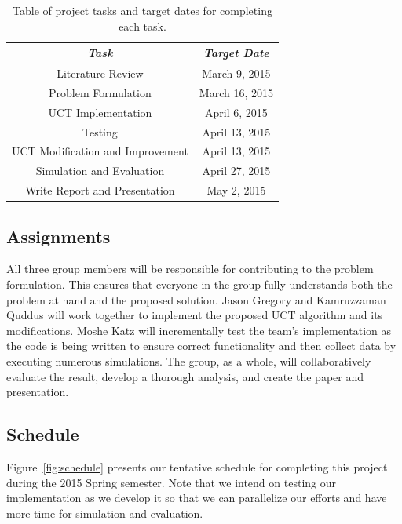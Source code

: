 \documentclass[a4paper,11pt]{article}
\begin{document}
%
\begin{table}[htbp]
  \centering
  \begin{tabular}{|c|c|}
    \hline
    \emph{Task} & \emph{Target Date} \\ 
    \hline
    Literature Review & March 9, 2015 \\ \hline
    Problem Formulation & March 16, 2015 \\ \hline
    UCT Implementation & April 6, 2015 \\ \hline
    Testing & April 13, 2015 \\ \hline
    UCT Modification and Improvement & April 13, 2015 \\ \hline
    Simulation and Evaluation & April 27, 2015 \\ \hline
    Write Report and Presentation & May 2, 2015 \\ \hline
  \end{tabular}
  \caption{Table of project tasks and target dates for completing each task.}
  \label{tab:deadlines}
\end{table}
%

\subsection{Assignments}\label{sec:assignments}
All three group members will be responsible for contributing to the problem formulation. This ensures that everyone in the group fully understands both the problem at hand and the proposed solution.  Jason Gregory and Kamruzzaman Quddus will work together to implement the proposed UCT algorithm and its modifications.  Moshe Katz will incrementally test the team's implementation as the code is being written to ensure correct functionality and then collect data by executing numerous simulations. The group, as a whole, will collaboratively evaluate the result, develop a thorough analysis, and create the paper and presentation.


\subsection{Schedule}\label{sec:schedule}
Figure~\ref{fig:schedule} presents our tentative schedule for completing this project during the 2015 Spring semester. Note that we intend on testing our implementation as we develop it so that we can parallelize our efforts and have more time for simulation and evaluation.
\end{document}
